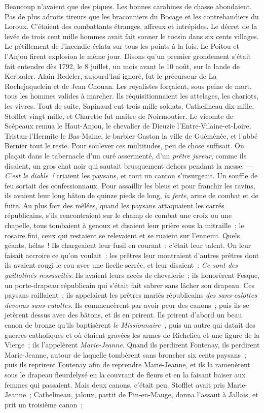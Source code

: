 \documentclass[french,twoside]{book} %
\begin{document}
\noindent Beaucoup n’avaient que des piques. Les bonnes carabines de chasse abondaient. Pas de plus adroits tireurs que les braconniers du Bocage et les contrebandiers du Loroux. C’étaient des combattants étranges, affreux et intrépides. Le décret de la levée de trois cent mille hommes avait fait sonner le tocsin dans six cents villages. Le pétillement de l’incendie éclata sur tous les points à la fois. Le Poitou et l’Anjou firent explosion le même jour. Disons qu’un premier grondement s’était fait entendre dès 1792, le 8 juillet, un mois avant le 10 août, sur la lande de Kerbader. Alain Redeler, aujourd’hui ignoré, fut le précurseur de La Rochejaquelein et de Jean Chouan. Les royalistes forçaient, sous peine de mort, tous les hommes valides à marcher. Ils réquisitionnaient les attelages, les chariots, les vivres. Tout de suite, Sapinaud eut trois mille soldats, Cathelineau dix mille, Stofflet vingt mille, et Charette fut maître de Noirmoutier. Le vicomte de Scépeaux remua le Haut-Anjou, le chevalier de Dieuzie l’Entre-Vilaine-et-Loire, Tristan-l’Hermite le Bas-Maine, le barbier Gaston la ville de Guéménée,  et l’abbé Bernier tout le reste. Pour soulever ces multitudes, peu de chose suffisait. On plaçait dans le tabernacle d’un curé assermenté, d’un \emph{prêtre jureur}, comme ils disaient, un gros chat noir qui sautait brusquement dehors pendant la messe. — \emph{C’est le diable !} criaient les paysans, et tout un canton s’insurgeait. Un souffle de feu sortait des confessionnaux. Pour assaillir les bleus et pour franchir les ravins, ils avaient leur long bâton de quinze pieds de long, \emph{la ferte}, arme de combat et de fuite. Au plus fort des mêlées, quand les paysans attaquaient les carrés républicains, s’ils rencontraient sur le champ de combat une croix ou une chapelle, tous tombaient à genoux et disaient leur prière sous la mitraille ; le rosaire fini, ceux qui restaient se relevaient et se ruaient sur l’ennemi. Quels géants, hélas ! Ils chargeaient leur fusil en courant ; c’était leur talent. On leur faisait accroire ce qu’on voulait ; les prêtres leur montraient d’autres prêtres dont ils avaient rougi le cou avec une ficelle serrée, et leur disaient : \emph{Ce sont des guillotinés ressuscités}. Ils avaient leurs accès de chevalerie ; ils honorèrent Fesque, un porte-drapeau républicain qui s’était fait sabrer sans lâcher son drapeau. Ces paysans raillaient ; ils appelaient les prêtres mariés républicains \emph{des sans-calottes devenus sans-culottes}. Ils commencèrent par avoir peur des canons ; puis ils se jetèrent dessus avec des bâtons, et ils en prirent. Ils prirent d’abord un beau canon de bronze qu’ils baptisèrent \emph{le Missionnaire ;} puis un autre qui datait des guerres catholiques et où étaient gravées les armes de Richelieu et  une figure de la Vierge ; ils l’appelèrent \emph{Marie-Jeanne}. Quand ils perdirent Fontenay, ils perdirent Marie-Jeanne, autour de laquelle tombèrent sans broncher six cents paysans ; puis ils reprirent Fontenay afin de reprendre Marie-Jeanne, et ils la ramenèrent sous le drapeau fleurdelysé en la couvrant de fleurs et en la faisant baiser aux femmes qui passaient. Mais deux canons, c’était peu. Stofflet avait pris Marie-Jeanne ; Cathelineau, jaloux, partit de Pin-en-Mauge, donna l’assaut à Jallais, et prit un troisième canon ; 
\end{document}

